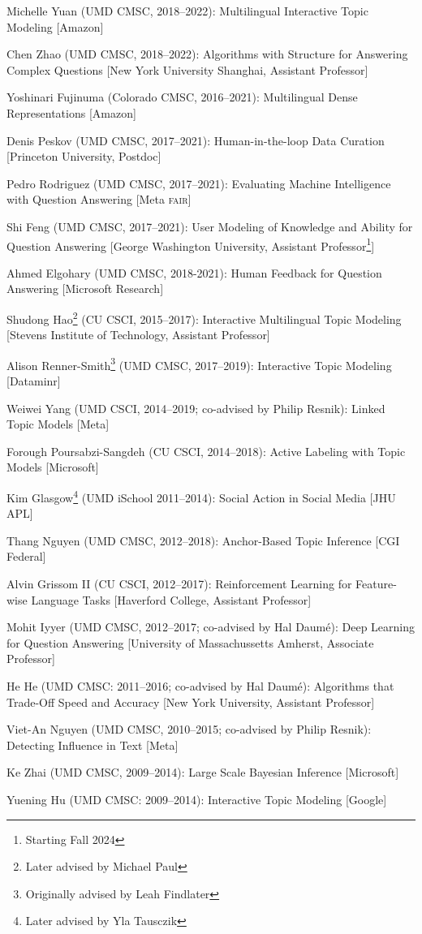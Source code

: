   \begin{enumerate*}
  \item Michelle Yuan (UMD CMSC, 2018--2022): Multilingual Interactive Topic
  Modeling [Amazon]
      \item Chen Zhao (UMD CMSC, 2018--2022): Algorithms with
        Structure for Answering Complex Questions [New York
        University Shanghai, Assistant Professor]
  \item Yoshinari Fujinuma (Colorado CMSC, 2016--2021): Multilingual
    Dense Representations [Amazon]        
      \item Denis Peskov (UMD CMSC, 2017--2021): Human-in-the-loop
        Data Curation [Princeton University, Postdoc]
\item Pedro Rodriguez (UMD CMSC, 2017--2021): Evaluating Machine
  Intelligence with Question Answering [Meta \textsc{fair}]
\item Shi Feng (UMD CMSC, 2017--2021): User Modeling of Knowledge and
  Ability for Question Answering [George Washington University, Assistant Professor\footnote{Starting Fall 2024}]
\item Ahmed Elgohary (UMD CMSC, 2018-2021): Human Feedback for
  Question Answering [Microsoft Research]
\item Shudong Hao\footnote{Later advised by Michael Paul} (CU CSCI, 2015--2017): Interactive Multilingual
  Topic Modeling [Stevens Institute of Technology, Assistant Professor]
  \item Alison Renner-Smith\footnote{Originally advised by Leah Findlater} (UMD CMSC, 2017--2019): Interactive Topic Modeling [Dataminr]
\item Weiwei Yang (UMD CSCI, 2014--2019; co-advised by Philip Resnik): Linked Topic Models [Meta]
\item Forough Poursabzi-Sangdeh (CU CSCI, 2014--2018): Active Labeling with Topic Models [Microsoft]
\item Kim Glasgow\footnote{Later advised by Yla Tausczik} (UMD iSchool 2011--2014): Social Action in Social Media [JHU APL]
\item Thang Nguyen (UMD CMSC, 2012--2018): Anchor-Based
  Topic Inference [CGI Federal]
\item Alvin Grissom II (CU CSCI, 2012--2017):
  Reinforcement Learning for Feature-wise Language Tasks [Haverford College, Assistant Professor]
\item Mohit Iyyer (UMD CMSC, 2012--2017; co-advised by Hal Daum\'e): Deep Learning for Question
  Answering [University of Massachussetts Amherst,
  Associate Professor]
\item He He (UMD CMSC: 2011--2016; co-advised by Hal Daum\'e): Algorithms that Trade-Off Speed and Accuracy [New York University, Assistant Professor]
\item Viet-An Nguyen (UMD CMSC, 2010--2015; co-advised by Philip Resnik): Detecting Influence in Text [Meta]
\item Ke Zhai (UMD CMSC, 2009--2014): Large Scale Bayesian Inference [Microsoft]
\item Yuening Hu (UMD CMSC: 2009--2014): Interactive Topic Modeling [Google]
\end{enumerate*}
